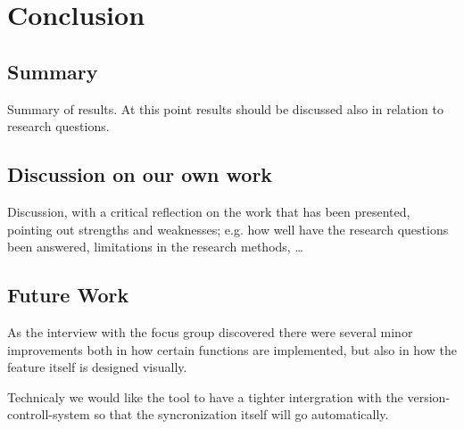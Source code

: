 \chapter{Conclusion}

\section{Summary}
Summary of results. At this point results should be discussed also in
relation to research questions.

\section{Discussion on our own work}
Discussion, with a critical reflection on the work that has been presented,
pointing out strengths and weaknesses; e.g. how well have the research questions been answered, limitations in the research methods, …

\section{Future Work}
As the interview with the focus group discovered there were several minor improvements both in how certain functions are implemented, but also in how the feature itself is designed visually. 

Technicaly we would like the tool to have a tighter intergration with the version-controll-system so that the syncronization itself will go automatically.